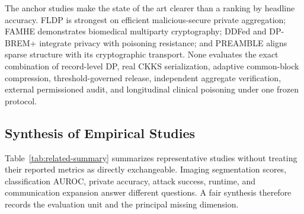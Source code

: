 The anchor studies make the state of the art clearer than a ranking by headline accuracy. FLDP is strongest on efficient malicious-secure private aggregation; FAMHE demonstrates biomedical multiparty cryptography; DDFed and DP-BREM+ integrate privacy with poisoning resistance; and PREAMBLE aligns sparse structure with its cryptographic transport. None evaluates the exact combination of record-level DP, real CKKS serialization, adaptive common-block compression, threshold-governed release, independent aggregate verification, external permissioned audit, and longitudinal clinical poisoning under one frozen protocol.

\subsection{Synthesis of Empirical Studies}

Table~\ref{tab:related-summary} summarizes representative studies without treating their reported metrics as directly exchangeable. Imaging segmentation scores, classification AUROC, private accuracy, attack success, runtime, and communication expansion answer different questions. A fair synthesis therefore records the evaluation unit and the principal missing dimension.

